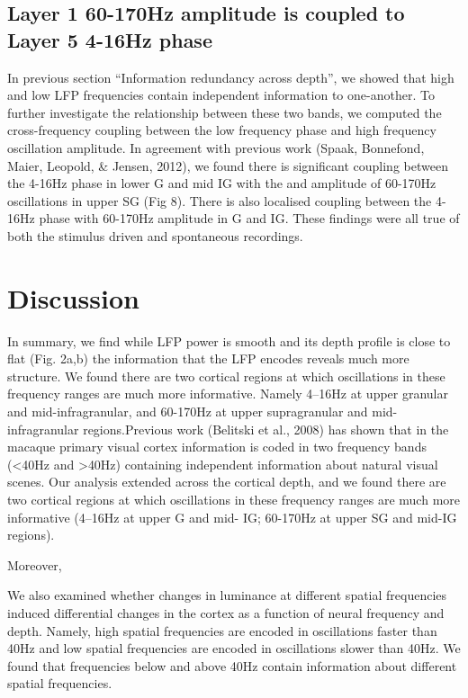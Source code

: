 \documentclass{article}
\begin{document}
\subsection{Layer 1 60-170Hz amplitude is coupled to Layer 5 4-16Hz phase}
In previous section ``Information redundancy across depth'', we showed that high and low LFP frequencies contain independent information to one-another. To further investigate the relationship between these two bands, we computed the cross-frequency coupling between the low frequency phase and high frequency oscillation amplitude. In agreement with previous work (Spaak, Bonnefond, Maier, Leopold, \& Jensen, 2012), we found there is significant coupling between the 4-16Hz phase in lower G and mid IG with the and amplitude of 60-170Hz oscillations in upper SG (Fig 8). There is also localised coupling between the 4-16Hz phase with 60-170Hz amplitude in G and IG. These findings were all true of both the stimulus driven and spontaneous recordings.

\section{Discussion}
In summary, we find while LFP power is smooth and its depth profile is close to flat (Fig. 2a,b) the information that the LFP encodes reveals much more structure. We found there are two cortical regions at which oscillations in these frequency ranges are much more informative. Namely 4--16Hz at upper granular and mid-infragranular, and 60-170Hz at upper supragranular and mid{}-infragranular regions.Previous work (Belitski et al., 2008) has shown that in the macaque primary visual cortex information is coded in two frequency bands ({\textless}40Hz and {\textgreater}40Hz) containing independent information about natural visual scenes. Our analysis extended across the cortical depth, and we found there are two cortical regions at which oscillations in these frequency ranges are much more informative (4--16Hz at upper G and mid- IG; 60-170Hz at upper SG and mid-IG regions).

Moreover, 

We also examined whether changes in luminance at different spatial frequencies induced differential changes in the cortex as a function of neural frequency and depth. Namely, high spatial frequencies are encoded in oscillations faster than 40Hz and low spatial frequencies are encoded in oscillations slower than 40Hz. We found that frequencies below and above 40Hz contain information about different spatial frequencies.
\end{document}
